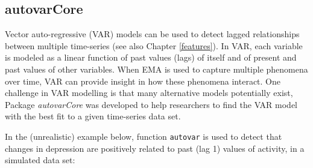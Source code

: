 \documentclass[]{book}
\begin{document}
\subsection{autovarCore}\label{autovarcore}

 


Vector auto-regressive (VAR) models can be used to detect lagged
relationships between multiple time-series (see also Chapter
\ref{features}). In VAR, each variable is modeled as a linear function
of past values (lags) of itself and of present and past values of other
variables. When EMA is used to capture multiple phenomena over time, VAR
can provide insight in how these phenomena interact. One challenge in
VAR modelling is that many alternative models potentially exist, Package
\emph{autovarCore} \citep{R-autovarCore} was developed to help
researchers to find the VAR model with the best fit to a given
time-series data set.

In the (unrealistic) example below, function \texttt{autovar} is used to
detect that changes in depression are positively related to past (lag 1)
values of activity, in a simulated data set:
\end{document}
